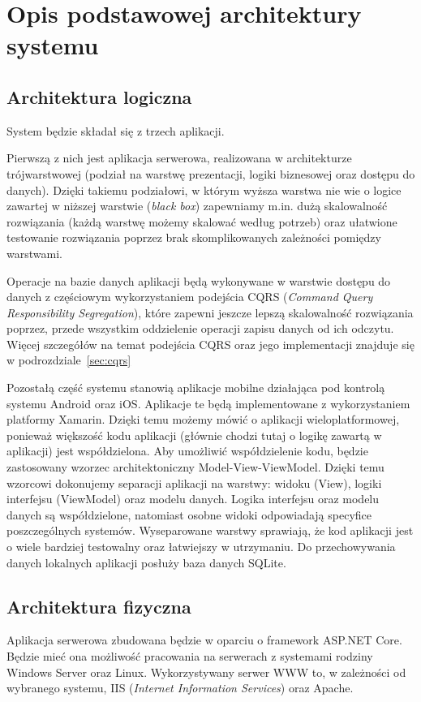\section{Opis podstawowej architektury systemu}
\subsection*{Architektura logiczna}
System będzie składał się z trzech aplikacji. 

\par Pierwszą z nich jest aplikacja serwerowa, realizowana w architekturze trójwarstwowej (podział na warstwę prezentacji, logiki biznesowej oraz dostępu do danych). Dzięki takiemu podziałowi, w którym wyższa warstwa nie wie o logice zawartej w niższej warstwie (\textit{black box}) zapewniamy m.in. dużą skalowalność rozwiązania (każdą warstwę możemy skalować według potrzeb) oraz ułatwione testowanie rozwiązania poprzez brak skomplikowanych zależności pomiędzy warstwami.

\par Operacje na bazie danych aplikacji będą wykonywane w warstwie dostępu do danych z częściowym wykorzystaniem podejścia CQRS (\textit{Command Query Responsibility Segregation}), które zapewni jeszcze lepszą skalowalność rozwiązania poprzez, przede wszystkim oddzielenie operacji zapisu danych od ich odczytu. Więcej szczegółów na temat podejścia CQRS oraz jego implementacji znajduje się w podrozdziale~\ref{sec:cqrs}

\par Pozostałą część systemu stanowią aplikacje mobilne działająca pod kontrolą systemu Android oraz iOS. Aplikacje te będą implementowane z wykorzystaniem platformy Xamarin. Dzięki temu możemy mówić o aplikacji wieloplatformowej, ponieważ większość kodu aplikacji (głównie chodzi tutaj o logikę zawartą w aplikacji) jest współdzielona. Aby umożliwić współdzielenie kodu, będzie zastosowany wzorzec architektoniczny Model-View-ViewModel. Dzięki temu wzorcowi dokonujemy separacji aplikacji na warstwy: widoku (View), logiki interfejsu (ViewModel) oraz modelu danych. Logika interfejsu oraz modelu danych są współdzielone, natomiast osobne widoki odpowiadają specyfice poszczególnych systemów. Wyseparowane warstwy sprawiają, że kod aplikacji jest o wiele bardziej testowalny oraz łatwiejszy w utrzymaniu. Do przechowywania danych lokalnych aplikacji posłuży baza danych SQLite.

\subsection*{Architektura fizyczna}
Aplikacja serwerowa zbudowana będzie w oparciu o framework ASP.NET Core. Będzie mieć ona możliwość pracowania na serwerach z systemami rodziny Windows Server oraz Linux. Wykorzystywany serwer WWW to, w zależności od wybranego systemu, IIS (\textit{Internet Information Services}) oraz Apache.

